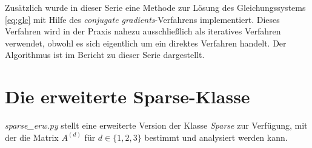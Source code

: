 \documentclass[letterpaper,10pt,ngerman, oneside, openright]{sphinxmanual}
\begin{document}
Zusätzlich wurde in dieser Serie eine Methode zur Lösung des Gleichungssystems \eqref{eq:glc} mit Hilfe des \emph{conjugate gradients}-Verfahrens implementiert. Dieses Verfahren wird in der Praxis nahezu ausschließlich als iteratives Verfahren verwendet, obwohl es sich eigentlich um ein direktes Verfahren handelt. Der Algorithmus ist im Bericht zu dieser Serie dargestellt.

%


\chapter{Die erweiterte Sparse-Klasse}

\label{\detokenize{index:welcome-to-serie-3-s-documentation}}\label{\detokenize{index:module-sparse_erw}}\label{\detokenize{index:die-sparse-klasse}}
\textit{sparse\_erw.py} stellt eine erweiterte Version der  Klasse \textit{Sparse} zur Verfügung, mit der die Matrix $A^{(d)}$ für $d\in\{1,2,3\}$
bestimmt und analysiert werden kann.
\end{document}
